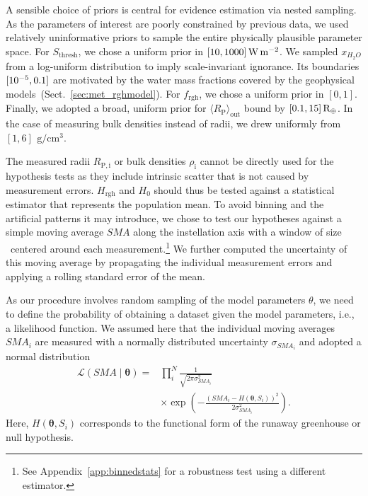 \documentclass[twocolumn,twocolappendix]{aastex631}
\begin{document}
A sensible choice of priors is central for evidence estimation via nested sampling.
As the parameters of interest are poorly constrained by previous data, we used relatively uninformative priors to sample the entire physically plausible parameter space.
For $S_\mathrm{thresh}$, we chose a uniform prior in $[10,1000]\, \SI{}{\watt\per\meter\squared}$.
We sampled $x_{H_2O}$ from a log-uniform distribution to imply scale-invariant ignorance.
Its boundaries $[10^{-5}, 0.1]$ are motivated by the water mass fractions covered by the geophysical models~(Sect.~\ref{sec:met_rghmodel}).
For $f_\mathrm{rgh}$, we chose a uniform prior in $[0, 1]$.
Finally, we adopted a broad, uniform prior for $\langle R_\mathrm{P}\rangle_\mathrm{out}$ bound by $[0.1, 15] \, \mathrm{R_\oplus}$.
In the case of measuring bulk densities instead of radii, we drew uniformly from $[1, 6] \, \SI{}{\gram\per\centi\meter\cubed}$.

The measured radii $R_\mathrm{P, i}$ or bulk densities $\rho_\mathrm{i}$ cannot be directly used for the hypothesis tests as they include intrinsic scatter that is not caused by measurement errors.
$H_{\mathrm{rgh}}$ and $H_0$ should thus be tested against a statistical estimator that represents the population mean.
To avoid binning and the artificial patterns it may introduce, we chose to test our hypotheses against a simple moving average $SMA$ along the instellation axis with a window of size \windowsize\ centered around each measurement.\footnote{See Appendix~\ref{app:binnedstats} for a robustness test using a different estimator.}
We further computed the uncertainty of this moving average by propagating the individual measurement errors and applying a rolling standard error of the mean. %

As our procedure involves random sampling of the model parameters $\theta$, we need to define the probability of obtaining a dataset given the model parameters, i.e., a likelihood function.
We assumed here that the individual moving averages $SMA_i$ are measured with a normally distributed uncertainty $\sigma_{SMA_i}$ and adopted a normal distribution
\begin{eqnarray}
    \mathcal{L}(SMA \mid \boldsymbol{\theta})= & \prod_{i}^{N} \frac{1}{\sqrt{2 \pi \sigma_{SMA_i}^{2}}} \\
    & \times \exp \left(-\frac{\left(SMA_i - H\left(\boldsymbol{\theta}, S_i\right)\right)^{2}}{2 \sigma_{SMA_i}^{2}}\right).
\end{eqnarray}
Here, $H\left(\boldsymbol{\theta}, S_i\right)$ corresponds to the functional form of the runaway greenhouse or null hypothesis.
\end{document}
